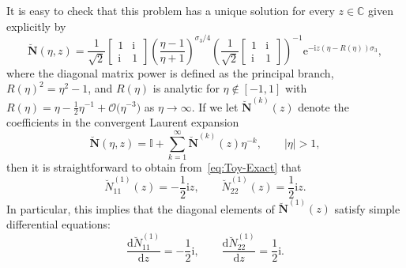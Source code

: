 \documentclass[pdftex]{sigma}
\numberwithin{equation}{section}
\begin{document}
It is easy to check that this problem has a unique solution for every $z\in\mathbb{C}$ given explicitly by%
\begin{equation}
\breve{\mathbf{N}}(\eta,z)=\frac{1}{\sqrt{2}}\begin{bmatrix}1 & \mathrm{i}\\\mathrm{i} & 1\end{bmatrix}\left(\frac{\eta-1}{\eta+1}\right)^{\sigma_3/4}\left(\frac{1}{\sqrt{2}}\begin{bmatrix}1&\mathrm{i}\\\mathrm{i} & 1\end{bmatrix}\right)^{-1}
\mathrm{e}^{-\mathrm{i} z (\eta-R(\eta))\sigma_3},
\label{eq:Toy-Exact}
\end{equation}
where the diagonal matrix power is defined as the principal branch, $R(\eta)^2=\eta^2-1$, and $R(\eta)$ is analytic for $\eta\not\in [-1,1]$ with $R(\eta)=\eta-\frac{1}{2}\eta^{-1}+\mathcal{O}\bigl(\eta^{-3}\bigr)$ as $\eta\to\infty$.
If we let $\breve{\mathbf{N}}^{(k)}(z)$ denote the coefficients in the convergent Laurent expansion
\begin{equation}
\breve{\mathbf{N}}(\eta,z)=\mathbb{I}+\sum_{k=1}^\infty\breve{\mathbf{N}}^{(k)}(z)\eta^{-k},\qquad |\eta|>1,
\label{eq:Toy-expansion}
\end{equation}
then it is straightforward to obtain from~\eqref{eq:Toy-Exact} that
\[
\breve{N}^{(1)}_{11}(z)=-\frac{1}{2}\mathrm{i} z,\qquad \breve{N}^{(1)}_{22}(z)=\frac{1}{2}\mathrm{i} z.
\]
In particular, this implies that the diagonal elements of $\breve{\mathbf{N}}^{(1)}(z)$ satisfy simple differential equations:
\begin{equation}
\frac{\mathrm{d}\breve{N}^{(1)}_{11}}{\mathrm{d} z}=-\frac{1}{2}\mathrm{i},\qquad\frac{\mathrm{d}\breve{N}^{(1)}_{22}}{\mathrm{d} z}=\frac{1}{2}\mathrm{i}.
\label{eq:diagonal-ODE-Toy}
\end{equation}
\end{document}
